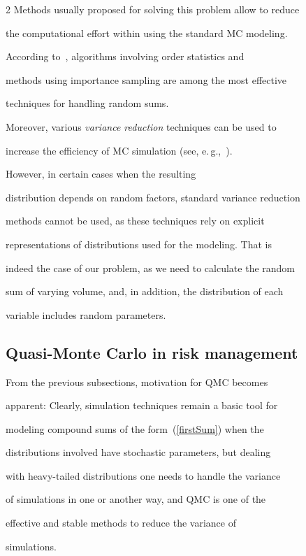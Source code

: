 \begin{multicols}{2}
Methods usually proposed for solving this problem allow to reduce

the computational effort within using the standard MC modeling.

According to~\cite{Asmus-t}, algorithms involving order statistics and

methods using importance sampling are among the most effective

techniques for handling random sums.

Moreover, various {\it variance reduction} techniques can be used to

increase the efficiency of MC simulation (see, e.\,g.,~\cite{Glasserman, Robert}).

However, in certain cases when the resulting

distribution depends on random factors, standard variance reduction

methods cannot be used, as these techniques rely on explicit

representations of distributions used for the modeling. That is

indeed the case of our problem, as we need to calculate the random

sum of varying volume, and, in addition, the distribution of each

variable includes random parameters.



\subsection{Quasi-Monte Carlo in risk management}



\noindent

From the previous subsections, motivation for QMC becomes

apparent: Clearly, simulation techniques remain a basic tool for

modeling compound sums of the form~(\ref{firstSum}) when the

distributions involved have stochastic parameters, but dealing

with heavy-tailed distributions one needs to handle the variance

of simulations in one or another way, and QMC is one of the

effective and stable methods to reduce the variance of

simulations.




\end{multicols}
